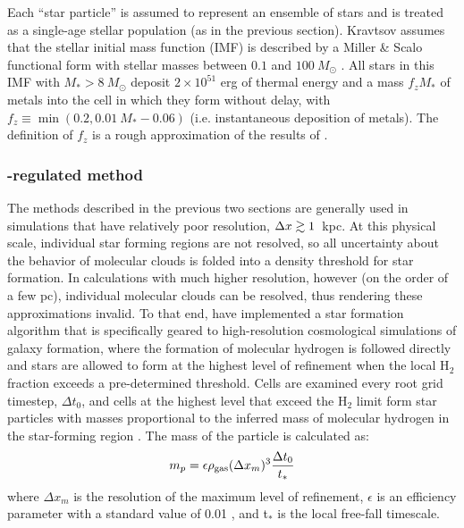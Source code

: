 Each ``star particle'' is assumed to represent an ensemble of stars
and is treated as a single-age stellar population (as in the previous
section).  Kravtsov assumes that the stellar initial mass function (IMF) is described by a Miller \&
Scalo functional form with stellar masses between $0.1$ and
$100~M_\odot$ \citep{1979ApJS...41..513M}.  All stars in this IMF with
$M_* > 8~M_\odot$ deposit $2 \times 10^{51}$ erg of thermal energy
and a mass $f_z M_*$ of metals into the cell in which they form
without delay, with $f_z \equiv \min(0.2, 0.01~M_*-0.06)$
(i.e. instantaneous deposition of metals).  The definition of $f_z$ is
a rough approximation of the results of \citet{1995ApJS..101..181W}.


\subsubsection{\HH-regulated method}
\label{sec:starform_H2reg}

The methods described in the previous two sections are generally used
in simulations that have relatively poor resolution, $\Delta x \gtrsim 1$~kpc.
At this physical scale, individual star forming regions are not
resolved, so all uncertainty about the behavior of molecular clouds is
folded into a density threshold for star formation.  In calculations
with much higher resolution, however (on the order of a few pc), individual
molecular clouds can be resolved, thus rendering these approximations
invalid.  To that end, \citet{2012ApJ...749...36K} have implemented
a star formation algorithm that is specifically geared to
high-resolution cosmological simulations of galaxy formation, where
the formation of molecular hydrogen is followed directly and stars
are allowed to form at the highest level of refinement when the local
H$_2$ fraction exceeds a pre-determined threshold.  Cells are examined
every root grid timestep, $\Delta t_0$, and cells at the highest level
that exceed the H$_2$ limit form star particles with masses
proportional to the inferred mass of molecular hydrogen in the
star-forming region
\citep{2008ApJ...689..865K,2009ApJ...693..216K,2010ApJ...709..308M}.
The mass of the particle is calculated as:
\begin{equation} 
m_p = \epsilon \rho_{\rm gas} (\Delta x_{m})^3 \frac{\Delta t_0}{t_*}
\end{equation}
where $\Delta x_{m}$ is the resolution of the maximum level of
refinement, $\epsilon$ is an efficiency parameter with a standard
value of 0.01 \citep[as motivated by][]{2007ApJ...654..304K}, and
t$_*$ is the local free-fall timescale.

